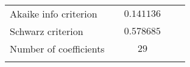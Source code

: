\begin{tabular}{lrrrr}
\multicolumn{1}{l}{Akaike info criterion}&\multicolumn{1}{c}{}&\multicolumn{1}{c}{$0.141136$}&\multicolumn{1}{c}{}&\multicolumn{1}{c}{}\\
\multicolumn{1}{l}{Schwarz criterion}&\multicolumn{1}{c}{}&\multicolumn{1}{c}{$0.578685$}&\multicolumn{1}{c}{}&\multicolumn{1}{c}{}\\
\multicolumn{1}{l}{Number of coefficients}&\multicolumn{1}{c}{}&\multicolumn{1}{c}{$29$}&\multicolumn{1}{c}{}&\multicolumn{1}{c}{}\\
[4.5pt] \hline \\ [-4.5pt]
\end{tabular}
